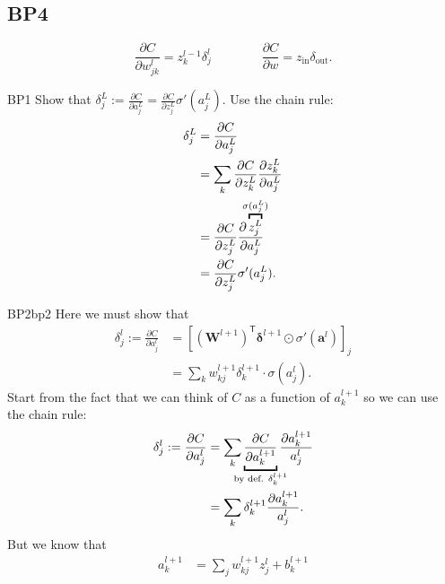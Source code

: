 \documentclass[a4paper,9pt]{extarticle}
\begin{document}
\begin{multicols*}{2}
		\subsection{BP4}
\begin{riquadro}
			\begin{equation*}
			\frac{\partial C}{\partial w_{jk}^{l}}=z_{k}^{l-1}\delta_{j}^{l}\qquad\qquad\frac{\partial C}{\partial w}=z_{\text{in}}\delta_{\text{out}}.
		\end{equation*}
\end{riquadro}
		\begin{myproof}{\color{LightSalmon2}BP1}{}
			Show that $\delta^{L}_{j}:=\frac{\partial C}{\partial a^{L}_{j}}=\frac{\partial C}{\partial z^{L}_{j}}\sigma'(a^{L}_{j})$. Use the chain rule:
			\begin{align*}
				\delta^{L}_{j}&=\frac{\partial C}{\partial a^{L}_{j}}\\
				&=\sum_{k}\frac{\partial C}{\partial z^{L}_{k}}\frac{\partial z^{L}_{k}}{\partial a^{L}_{j}}\\
				&=\frac{\partial C}{\partial z^{L}_{j}}\frac{\partial \overbracket{z^{L}_{j}}^{\mathclap{\sigma(a^{L}_{j})}}}{\partial a^{L}_{j}}\\
				&=\frac{\partial C}{\partial z^{L}_{j}}\sigma'(a^{L}_{j}).
			\end{align*}
		\end{myproof}
		\begin{myproof}{\color{LightSalmon2}BP2}{bp2}
			Here we must show that 
			\begin{align*}
				\delta^{l}_{j}:=\frac{\partial C}{\partial a^{l}_{j}}&={\left[(\mathbf{W}^{l+1})^{\mathsf{T}}\boldsymbol{\delta}^{l+1}\odot\sigma'(\mathbf{a}^{l})\right]}_{j}\\
				&=\sum_{k}w_{kj}^{l+1}\delta_{k}^{l+1}\cdot\sigma(a^{l}_{j}).
			\end{align*}
			Start from the fact that we can think of $C$ as a function of $a^{l+1}_{k}$ so we can use the chain rule:
			\begin{align*}
				\delta^{l}_{j}:=\frac{\partial C}{\partial a_{j}^{l}}&=\sum_{k}\underbracket{\frac{\partial C}{\partial a^{l+1}_{k}}}_{\mathclap{\text{by def. }\delta_{k}^{l+1}}}\frac{\partial a^{l+1}_{k}}{a^{l}_{j}}\\
				&=\sum_{k}\delta_{k}^{l+1}\frac{\partial a^{l+1}_{k}}{a^{l}_{j}}.
			\end{align*}
			But we know that
			\begin{align*}
				a^{l+1}_{k}&=\sum_{j}w_{kj}^{l+1}z^{l}_{j}+b^{l+1}_{k}\\

\end{align*}
\end{myproof}
\end{multicols*}
\end{document}
